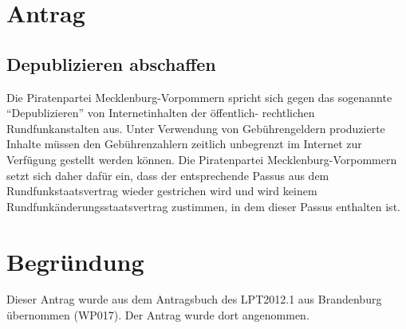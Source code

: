 \section{Antrag}

\subsection{Depublizieren abschaffen}

Die Piratenpartei Mecklenburg-Vorpommern spricht sich gegen das sogenannte ``Depublizieren'' von Internetinhalten der öffentlich- rechtlichen Rundfunkanstalten aus. Unter Verwendung von Gebührengeldern produzierte Inhalte müssen den Gebührenzahlern zeitlich unbegrenzt im Internet zur Verfügung gestellt werden können. Die Piratenpartei Mecklenburg-Vorpommern setzt sich daher dafür ein, dass der entsprechende Passus aus dem Rundfunkstaatsvertrag wieder gestrichen wird und wird keinem Rundfunkänderungsstaatsvertrag zustimmen, in dem dieser Passus enthalten ist.

\section{Begründung}

Dieser Antrag wurde aus dem Antragsbuch des LPT2012.1 aus Brandenburg übernommen (WP017). Der Antrag wurde dort angenommen.
